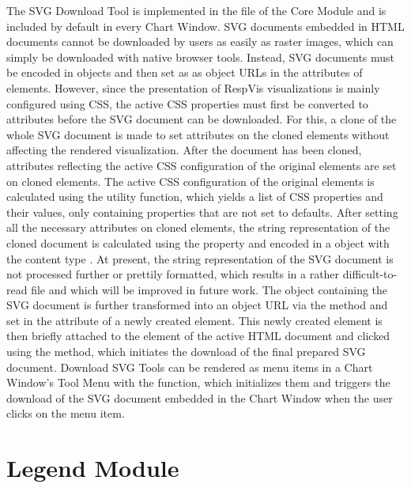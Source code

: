 The SVG Download Tool is implemented in the
 file of the Core Module and is
included by default in every Chart Window. SVG documents embedded in
HTML documents cannot be downloaded by users as easily as raster
images, which can simply be downloaded with native browser tools.
Instead, SVG documents must be encoded in  objects and then
set as as object URLs in the  attributes of 
elements. However, since the presentation of RespVis visualizations is
mainly configured using CSS, the active CSS properties must first be
converted to attributes before the SVG document can be downloaded.
For this, a clone of the whole SVG document is made to set attributes
on the cloned elements without affecting the rendered visualization.
After the document has been cloned, attributes reflecting the active
CSS configuration of the original elements are set on cloned elements.
The active CSS configuration of the original elements is calculated
using the  utility function,
which yields a list of CSS properties and their values, only
containing properties that are not set to defaults. After setting all
the necessary attributes on cloned elements, the string representation
of the cloned document is calculated using the
 property and encoded in a  object
with the content type . At present, the string
representation of the SVG document is not processed further or
prettily formatted, which results in a rather difficult-to-read file
and which will be improved in future work. The  object
containing the SVG document is further transformed into an object URL
via the  method and set in the 
attribute of a newly created  element. This newly created
 element is then briefly attached to the 
element of the active HTML document and clicked using the
 method, which initiates the download of the final
prepared SVG document. Download SVG Tools can be rendered as menu
items in a Chart Window's Tool Menu with the
 function, which initializes them and
triggers the download of the SVG document embedded in the Chart Window
when the user clicks on the menu item.




\section{Legend Module}

